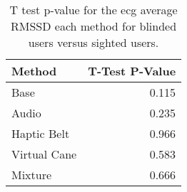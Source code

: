 
\begin{table}[!htb]
\centering
\caption{T test p-value for the ecg average RMSSD each method for blinded users versus sighted users.}
\label{tab:ttest_ecg_rmssd}
\begin{tabular}{lr}
\toprule
      Method &  T-Test P-Value \\
\midrule
        Base &           0.115 \\
       Audio &           0.235 \\
 Haptic Belt &           0.966 \\
Virtual Cane &           0.583 \\
     Mixture &           0.666 \\
\bottomrule
\end{tabular}
\end{table}

